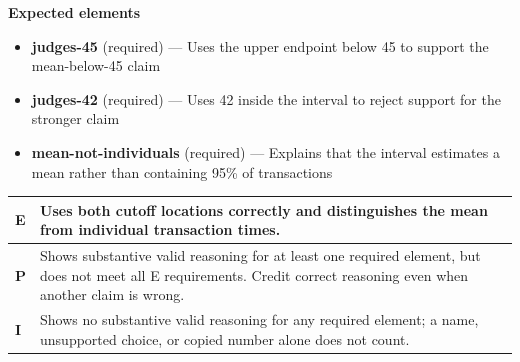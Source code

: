 \documentclass[11pt]{article}
\begin{document}

\textbf{Expected elements}
\begin{itemize}[leftmargin=1.5em,itemsep=2pt,topsep=2pt]
  \item \textbf{judges-45} (required) --- Uses the upper endpoint below 45 to support the mean-below-45 claim
  \item \textbf{judges-42} (required) --- Uses 42 inside the interval to reject support for the stronger claim
  \item \textbf{mean-not-individuals} (required) --- Explains that the interval estimates a mean rather than containing 95\% of transactions
\end{itemize}

{\small\renewcommand{\arraystretch}{1.25}
\noindent\begin{tabular}{|p{0.5in}|p{5.9in}|}
\hline
\textbf{E} & Uses both cutoff locations correctly and distinguishes the mean from individual transaction times. \\ \hline
\textbf{P} & Shows substantive valid reasoning for at least one required element, but does not meet all E requirements. Credit correct reasoning even when another claim is wrong. \\ \hline
\textbf{I} & Shows no substantive valid reasoning for any required element; a name, unsupported choice, or copied number alone does not count. \\ \hline
\end{tabular}}

\clearpage
{}
\end{document}
